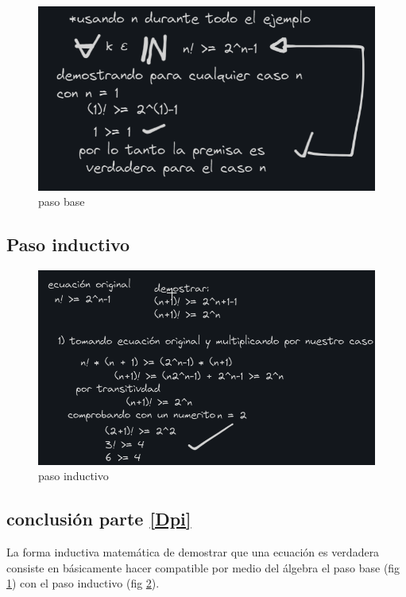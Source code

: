 \documentclass{article}
\begin{document}
\begin{figure}[H]
  \centering
  \includegraphics[scale=0.8]{../imgs/d0.png}
  \caption{paso base}
  \label{fig:1}
\end{figure}

\subsection*{Paso inductivo}\label{Pi}

\begin{figure}[H]
  \centering
  \includegraphics[scale=0.6]{../imgs/d1.png}
  \caption{paso inductivo}
  \label{fig:2}
\end{figure}

\subsection*{conclusión parte \ref{Dpi}}

La forma inductiva matemática de demostrar que una ecuación es verdadera consiste 
en básicamente hacer compatible por medio del álgebra el paso base (fig \ref{fig:1}) 
con el paso inductivo (fig \ref{fig:2}).   
\end{document}
